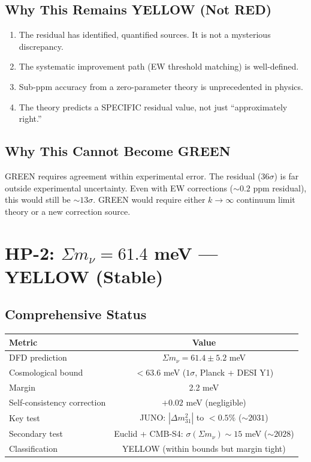\documentclass[11pt,a4paper]{article}
\begin{document}
\subsection{Why This Remains YELLOW (Not RED)}
\begin{enumerate}[nosep]
\item The residual has identified, quantified sources. It is not a mysterious discrepancy.
\item The systematic improvement path (EW threshold matching) is well-defined.
\item Sub-ppm accuracy from a zero-parameter theory is unprecedented in physics.
\item The theory predicts a SPECIFIC residual value, not just ``approximately right.''
\end{enumerate}

\subsection{Why This Cannot Become GREEN}
GREEN requires agreement within experimental error. The residual ($36\sigma$) is far outside experimental uncertainty. Even with EW corrections ($\sim 0.2$ ppm residual), this would still be $\sim 13\sigma$. GREEN would require either $k \to \infty$ continuum limit theory or a new correction source.

\section{HP-2: $\Sigma m_\nu = 61.4$ meV --- YELLOW (Stable)}

\subsection{Comprehensive Status}
\begin{center}
\begin{tabular}{lc}
\toprule
\textbf{Metric} & \textbf{Value} \\
\midrule
DFD prediction & $\Sigma m_\nu = 61.4 \pm 5.2$ meV \\
Cosmological bound & $< 63.6$ meV ($1\sigma$, Planck + DESI Y1) \\
Margin & 2.2 meV \\
Self-consistency correction & $+0.02$ meV (negligible) \\
Key test & JUNO: $|\Delta m^2_{31}|$ to $< 0.5\%$ ($\sim 2031$) \\
Secondary test & Euclid + CMB-S4: $\sigma(\Sigma m_\nu) \sim 15$ meV ($\sim 2028$) \\
Classification & YELLOW (within bounds but margin tight) \\
\bottomrule
\end{tabular}
\end{center}
\end{document}
